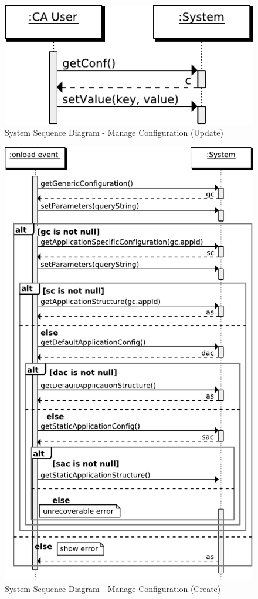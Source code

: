 \begin{figure}[htb]
    \centering
    \includegraphics{figures/spec-seq-manage-conf-update.pdf}
    \caption{System Sequence Diagram - Manage Configuration (Update)}
    \label{fig:spec-manage-conf-update}
\end{figure}

\begin{figure}[htb]
    \centering
    \includegraphics{figures/spec-seq-manage-conf-create.pdf}
    \caption{System Sequence Diagram - Manage Configuration (Create)}
    \label{fig:spec-manage-conf-create}
\end{figure}

